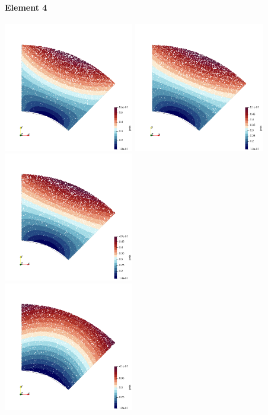 \paragraph{Element 4}


\begin{center}
\includegraphics[width=5.7cm]{images/mappings/biquadratic3/elt4/jcob_0}
\includegraphics[width=5.7cm]{images/mappings/biquadratic3/elt4/jcob_1}
\includegraphics[width=5.7cm]{images/mappings/biquadratic3/elt4/jcob_2}\\
\includegraphics[width=5.7cm]{images/mappings/biquadratic3/elt4/jcob_3}

\end{center}
